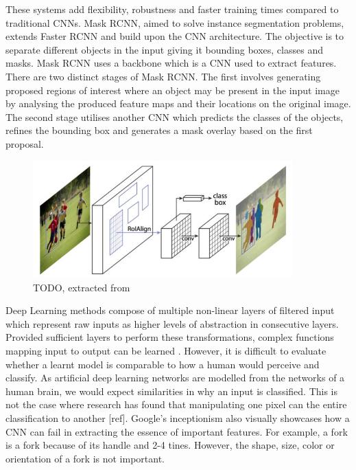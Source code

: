 These systems add flexibility, robustness and faster training times compared to traditional CNNs. Mask RCNN, aimed to solve instance segmentation problems, extends Faster RCNN and build upon the CNN architecture. The objective is to separate different objects in the input giving it bounding boxes, classes and masks. Mask RCNN uses a backbone which is a CNN used to extract features. There are two distinct stages of Mask RCNN. The first involves generating proposed regions of interest where an object may be present in the input image by analysing the produced feature maps and their locations on the original image. The second stage utilises another CNN which predicts the classes of the objects, refines the bounding box and generates a mask overlay based on the first proposal.


\begin{figure}[H]
	\begin{center}
		\includegraphics[width=100mm, scale=1]{maskrcnn.JPG}
		\caption{TODO, extracted from \cite{mordvintsev2015inceptionism}}
		\label{fig:cnn}
	\end{center}
\end{figure}
Deep Learning methods compose of multiple non-linear layers of filtered input which represent raw inputs as higher levels of abstraction in consecutive layers. Provided sufficient layers to perform these transformations, complex functions mapping input to output can be learned \cite{lecun2015deep}.
However, it is difficult to evaluate whether a learnt model is comparable to how a human would perceive and classify. As artificial deep learning networks are modelled from the networks of a human brain, we would expect similarities in why an input is classified. This is not the case where research has found that manipulating one pixel can the entire classification to another [ref]. Google's inceptionism also visually showcases how a CNN can fail in extracting the essence of important features. For example, a fork is a fork because of its handle and 2-4 tines. However, the shape, size, color or orientation of a fork is not important. 

